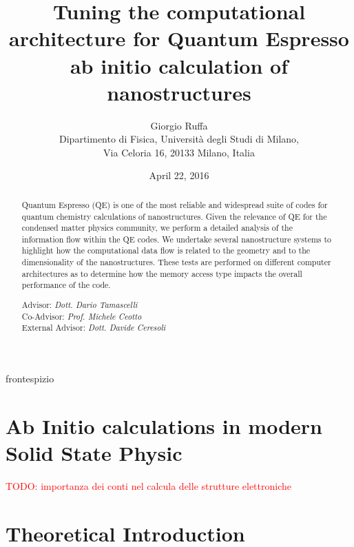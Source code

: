 \documentclass[a4paper,12pt]{article}
\newcommand\mynotes[1]{\begin{flushright}

\textcolor{red}{TODO: #1}\end{flushright}}
\begin{document}
\title{\bf \Huge Tuning the computational architecture for Quantum Espresso ab initio calculation of nanostructures }


\author{Giorgio Ruffa\\
Dipartimento di Fisica, Universit\`a degli Studi di Milano,\\
Via Celoria 16, 20133 Milano, Italia
}
\date{April 22, 2016} %


 {frontespizio} %

\newpage\qquad
\newpage

\maketitle

\begin{abstract}

Quantum Espresso (QE) is one of the most reliable and widespread  suite of codes for quantum chemistry calculations of nanostructures. Given the relevance of QE for the condensed matter physics community, we perform a detailed analysis of the information flow within the QE codes. We undertake several nanostructure systems to highlight how the computational data flow is related to the geometry and to the dimensionality of the nanostructures. These tests are performed on different computer architectures as to determine how the memory access type impacts the overall performance of the code.

\vskip0.75cm
\hskip5cm
\parbox[t]{7cm}
{
Advisor: {\it Dott. Dario Tamascelli}\\
Co-Advisor: {\it Prof. Michele Ceotto}\\
External Advisor: {\it Dott. Davide Ceresoli}\\
}
\end{abstract}

\newpage
\tableofcontents
\newpage


\section{Ab Initio calculations in modern Solid State Physic}
\mynotes{importanza dei conti nel calcula delle strutture elettroniche}


\section{Theoretical Introduction}\label{model:sec}
\end{document}
